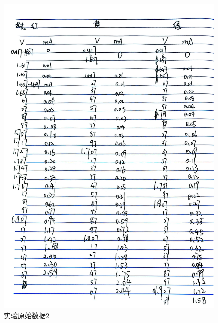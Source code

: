 \documentclass{ctexart}
\begin{document}
\begin{figure}[H]
  \centering
  \includegraphics[width=1\textwidth,height=0.8\textheight]{LED1.jpg}
  \caption{实验原始数据2}\label{LED1}
\end{figure}
\newpage
\end{document}

